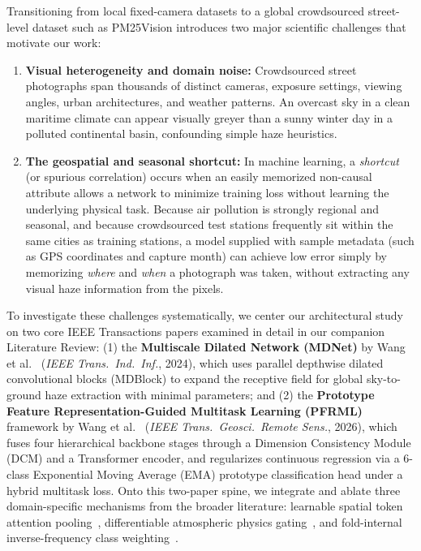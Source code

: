 \documentclass[conference]{IEEEtran}
\begin{document}
Transitioning from local fixed-camera datasets to a global crowdsourced
street-level dataset such as PM25Vision introduces two major scientific
challenges that motivate our work:
\begin{enumerate}
  \item \textbf{Visual heterogeneity and domain noise:} Crowdsourced street
        photographs span thousands of distinct cameras, exposure settings,
        viewing angles, urban architectures, and weather patterns. An overcast
        sky in a clean maritime climate can appear visually greyer than a sunny
        winter day in a polluted continental basin, confounding simple haze
        heuristics.
  \item \textbf{The geospatial and seasonal shortcut:} In machine learning, a
        \textit{shortcut} (or spurious correlation) occurs when an easily
        memorized non-causal attribute allows a network to minimize training
        loss without learning the underlying physical task. Because air
        pollution is strongly regional and seasonal, and because crowdsourced
        test stations frequently sit within the same cities as training
        stations, a model supplied with sample metadata (such as GPS coordinates
        and capture month) can achieve low error simply by memorizing
        \textit{where} and \textit{when} a photograph was taken, without
        extracting any visual haze information from the pixels.
\end{enumerate}

To investigate these challenges systematically, we center our architectural
study on two core IEEE Transactions papers examined in detail in our companion
Literature Review: (1) the \textbf{Multiscale Dilated Network (MDNet)} by Wang
et al.~\cite{wangLightweightAirQuality2024} (\textit{IEEE Trans.\ Ind.\ Inf.},
2024), which uses parallel depthwise dilated convolutional blocks (MDBlock) to
expand the receptive field for global sky-to-ground haze extraction with minimal
parameters; and (2) the \textbf{Prototype Feature Representation-Guided
Multitask Learning (PFRML)} framework by Wang et
al.~\cite{wangPrototypeFeatureRepresentationGuided2026} (\textit{IEEE
Trans.\ Geosci.\ Remote Sens.}, 2026), which fuses four hierarchical backbone
stages through a Dimension Consistency Module (DCM) and a Transformer encoder,
and regularizes continuous regression via a 6-class Exponential Moving Average
(EMA) prototype classification head under a hybrid multitask loss. Onto this
two-paper spine, we integrate and ablate three domain-specific mechanisms from
the broader literature: learnable spatial token attention
pooling~\cite{abdelsalamSkyFuseNetCrossAttentionSwin2026,
leeEnhancingPM25Detection2025}, differentiable atmospheric physics
gating~\cite{dohaDeepMultiTaskLearning2026, yadavRoadsideTreeImageBased2025,
marzaguiReviewImageQuality2024}, and fold-internal inverse-frequency class
weighting~\cite{dohaDeepMultiTaskLearning2026,
bylerLocationGeneralizabilityImageBased2025, mohanDeepLearningBasedPM252025}.
\end{document}
